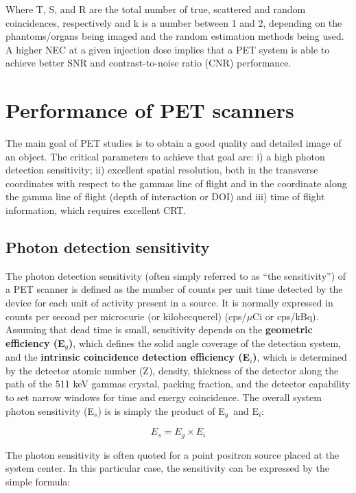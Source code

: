 \documentclass[review]{elsarticle}
\begin{document}
Where T, S, and R are the total number of true, scattered and random coincidences,
respectively and k is a number between 1 and 2, depending on the phantoms/organs being imaged
and the random estimation methods being used. A higher NEC at a given injection dose
implies that a PET system is able to achieve better SNR and contrast-to-noise ratio (CNR)
performance.

\section{Performance of PET scanners}
\label{sec.performance}

The main goal of PET studies is to obtain a good quality and detailed image of an object. The critical parameters to achieve that goal are: i) a high photon detection sensitivity; ii) excellent spatial resolution, both in the transverse coordinates with respect to the gammas line of flight and in the coordinate along the gamma line of flight (depth of interaction or DOI) and iii) time of flight information, which requires excellent CRT. 

\subsection*{Photon detection sensitivity}

The photon detection sensitivity (often simply referred to as ``the sensitivity'') of a PET scanner is defined as the number of counts per unit time detected by the device for each unit of activity present in a source. It is normally expressed in counts per second per microcurie (or kilobecquerel) (cps/$\mu$Ci or cps/kBq). 
Assuming that dead time is small, sensitivity depends on the 
{\bf geometric efficiency (E$_g$)}, which defines the solid angle coverage of the detection system, and the {\bf intrinsic coincidence detection efficiency (E$_i$)},
which is determined by the detector atomic
number (Z), density, thickness of the detector along the path of the 511 keV gammas crystal, packing fraction, and the detector capability to set narrow windows for time and energy coincidence. The overall system
photon sensitivity (E$_s$) is is simply the product of E$_g$~and E$_i$:

%
\begin{equation}
E_s = E_g \times E_i
\label{eq.gsensi}
\end{equation}

The photon sensitivity is often quoted for a
point positron source placed at the system center. In this particular case, the sensitivity can be expressed by the simple formula:
\end{document}
